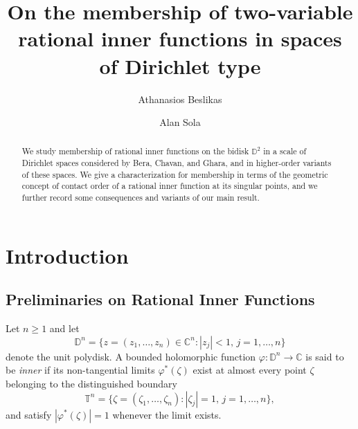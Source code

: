 \documentclass[11pt]{amsart}
\numberwithin{equation}{section}
\begin{document}
\author[Beslikas]{Athanasios Beslikas}
\address{Doctoral School of Exact and Natural Studies,
Institute of Mathematics,
Faculty of Mathematics and Computer Science,
Jagiellonian University,
\L{}ojasiewicza 6, PL30348, Cracow, Poland}

\author[Sola]{Alan Sola}
\address{Department of Mathematics, Stockholm University, 106 91 Stockholm, Sweden}

\title[Rational inner functions and Dirichlet spaces]{On the membership of two-variable rational inner functions in spaces of Dirichlet type}



\begin{abstract} 
We study membership of rational inner functions on the bidisk $\mathbb{D}^2$ in a scale of Dirichlet spaces considered by Bera, Chavan, and Ghara, and in higher-order variants of these spaces. We give a characterization for membership in terms of the geometric concept of contact order of a rational inner function at its singular points, and we further record some consequences and variants of our main result.
\end{abstract}

\maketitle
\section{Introduction} \label{Section 1}
\subsection{Preliminaries on Rational Inner Functions} 
Let $n \geq 1$ and let
\[\mathbb{D}^n=\{z=(z_1,\ldots, z_n)\in \mathbb{C}^n\colon |z_j|<1, \, j=1,\ldots, n\}\]
denote the unit polydisk. A bounded holomorphic function $\varphi\colon \mathbb{D}^n\to \mathbb{C}$ is said to be \textit{inner} if its non-tangential limits $\varphi^{*}(\zeta)$ exist at almost every point $\zeta$ belonging to the distinguished boundary
\[\mathbb{T}^n=\{\zeta=(\zeta_1,\ldots, \zeta_n)\colon |\zeta_j|=1, \, j=1,\ldots, n\},\]
and satisfy $|\varphi^{*}(\zeta)|=1$ whenever the limit exists.
\end{document}
